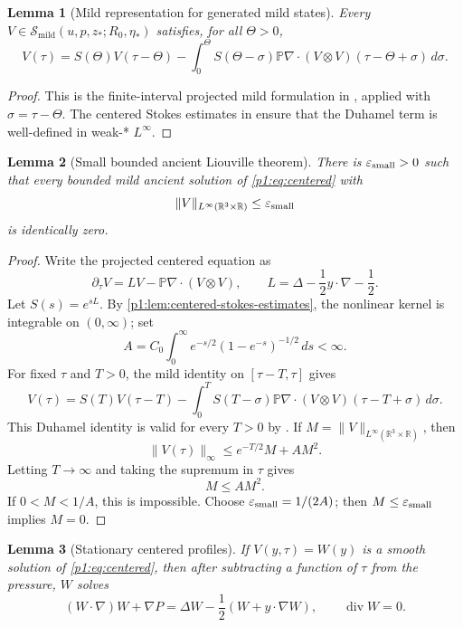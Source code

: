 \documentclass[11pt]{amsart}
\theoremstyle{plain}
\newtheorem{lemma}[lemma]{Lemma}
\theoremstyle{definition}
\theoremstyle{remark}
\numberwithin{equation}{section}
\newcommand{\R}{\mathbb R}
\newcommand{\divergence}{\operatorname{div}}
\newcommand{\calS}{\mathcal S}
\begin{document}
\begin{lemma}[Mild representation for generated mild states]
\label{p1:lem:mild-representation}
Every \(V\in\calS_{\mathrm{mild}}(u,p,z_*;R_0,\eta_*)\) satisfies, for all
\(\Theta>0\),
\[
   V(\tau)
   =
   S(\Theta)V(\tau-\Theta)
   -
   \int_0^\Theta
   S(\Theta-\sigma)\mathbb P\nabla\cdot
   (V\otimes V)(\tau-\Theta+\sigma)\,d\sigma .
\]
\end{lemma}

\begin{proof}
This is the finite-interval projected mild formulation in
, applied with \(\sigma=\tau-\Theta\).  The centered
Stokes estimates in  ensure that the
Duhamel term is well-defined in weak-* \(L^\infty\).
\end{proof}

\begin{lemma}[Small bounded ancient Liouville theorem]\label{p1:lem:small-liouville}
There is \(\varepsilon_{\rm small}>0\) such that every bounded mild ancient solution of
\eqref{p1:eq:centered} with
\[
   \|V\|_{L^\infty(\R^3\times\R)}\le\varepsilon_{\rm small}
\]
is identically zero.
\end{lemma}

\begin{proof}
Write the projected centered equation as
\[
   \partial_\tau V=LV-\mathbb P\nabla\cdot(V\otimes V),
   \qquad
   L=\Delta-\frac12 y\cdot\nabla-\frac12.
\]
Let \(S(s)=e^{sL}\).  By \cref{p1:lem:centered-stokes-estimates}, the nonlinear
kernel is integrable on \((0,\infty)\); set
\[
   A=C_0\int_0^\infty e^{-s/2}(1-e^{-s})^{-1/2}\,ds<\infty .
\]
For fixed \(\tau\) and \(T>0\), the mild identity on \([\tau-T,\tau]\) gives
\[
   V(\tau)
   =
   S(T)V(\tau-T)
   -
   \int_0^T
   S(T-\sigma)\mathbb P\nabla\cdot(V\otimes V)(\tau-T+\sigma)\,d\sigma .
\]
This Duhamel identity is valid for every \(T>0\) by
.
If \(M=\|V\|_{L^\infty(\R^3\times\R)}\), then
\[
   \|V(\tau)\|_\infty\le e^{-T/2}M+AM^2.
\]
Letting \(T\to\infty\) and taking the supremum in \(\tau\) gives
\[
   M\le AM^2.
\]
If \(0<M<1/A\), this is impossible.  Choose
\(\varepsilon_{\rm small}=1/(2A)\); then
\(M\le\varepsilon_{\rm small}\) implies \(M=0\).
\end{proof}

\begin{lemma}[Stationary centered profiles]\label{p1:lem:stationary-profile}
If \(V(y,\tau)=W(y)\) is a smooth solution of \eqref{p1:eq:centered}, then after
subtracting a function of \(\tau\) from the pressure, \(W\) solves
\[
   (W\cdot\nabla)W+\nabla P
   =
   \Delta W-\frac12(W+y\cdot\nabla W),
   \qquad \divergence W=0.
\]
\end{lemma}
\end{document}
